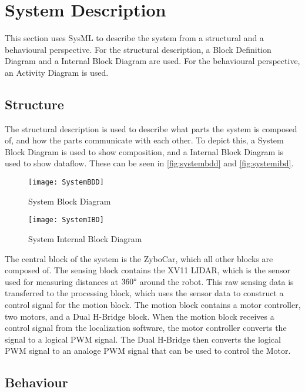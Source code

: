 \documentclass[Main]{subfiles}
\begin{document}
\section{System Description} %
\label{sec:system_description}

	This section uses SysML to describe the system from a structural and a behavioural perspective.
	For the structural description, a Block Definition Diagram and a Internal Block Diagram are used. 
	For the behavioural perspective, an Activity Diagram is used.
	
	\subsection{Structure} %
	\label{sub:system_structure}

		The structural description is used to describe what parts the system is composed of, and how the parts communicate with each other.
		To depict this, a System Block Diagram is used to show composition, and a Internal Block Diagram is used to show dataflow. 
		These can be seen in \autoref{fig:systembdd} and \autoref{fig:systemibd}.
		
		\begin{figure}[H]
			\centering
			\texttt{[image: SystemBDD]}
			\caption{System Block Diagram}
			\label{fig:systembdd}
		\end{figure}
		
		\begin{figure}[H]
			\centering
			\texttt{[image: SystemIBD]}
			\caption{System Internal Block Diagram}
			\label{fig:systemibd}
		\end{figure}
		
		The central block of the system is the ZyboCar, which all other blocks are composed of.
		The sensing block contains the XV11 LIDAR, which is the sensor used for measuring distances at $360\degree$ around the robot.
		This raw sensing data is transferred to the processing block, which uses the sensor data to construct a control signal for the motion block.
		The motion block contains a motor controller, two motors, and a Dual H-Bridge block.
		When the motion block receives a control signal from the localization software, the motor controller converts the signal to a logical PWM signal. 
		The Dual H-Bridge then converts the logical PWM signal to an analoge PWM signal that can be used to control the Motor.
		
	\subsection{Behaviour} %
	\label{sub:system_behaviour}
		
\end{document}
